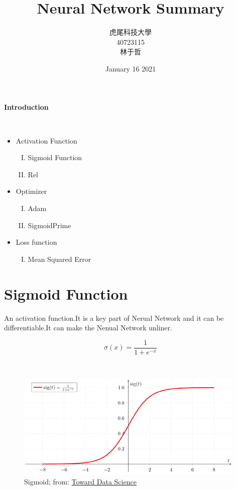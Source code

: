 \documentclass[12pt,a4paper]{article}
\title{Neural Network Summary}
\author{虎尾科技大學\\40723115\\ 林于哲}
\date{January 16 2021}
\begin{document}
\maketitle
\tableofcontents

\newpage
\begin{huge}\textbf{Introduction}\end{huge}\\
\begin{itemize}
\item Activation Function 
   \begin{enumerate}[I.]
   \item Sigmoid Function
   \item Rel
   \end{enumerate}
\end{itemize}   
\begin{itemize}
\item Optimizer
   \begin{enumerate}[I.]
   \item Adam
   \item SigmoidPrime
   \end{enumerate}
\end{itemize}  
\begin{itemize}   
\item Loss function
   \begin{enumerate}[I.]
   \item Mean Squared Error
   \end{enumerate}
\end{itemize} 


\section{Sigmoid Function}
An activation function.It is a key part of Nerual Network and it can be differentiable.It can make the Nenual Network unliner.\\
\begin{Large}$$\sigma(x)=\frac{1}{1+e^{-x}}$$ \end{Large}\\[6pt]
\begin{figure}[hbt!]
\begin{center}
\includegraphics[scale=0.74]{sigmoid}
\caption{Sigmoid; from: \href{https://towardsdatascience.com/derivative-of-the-sigmoid-function-536880cf918e}{Toward Data Science}}
\end{center}
\end{figure}
\end{document}
